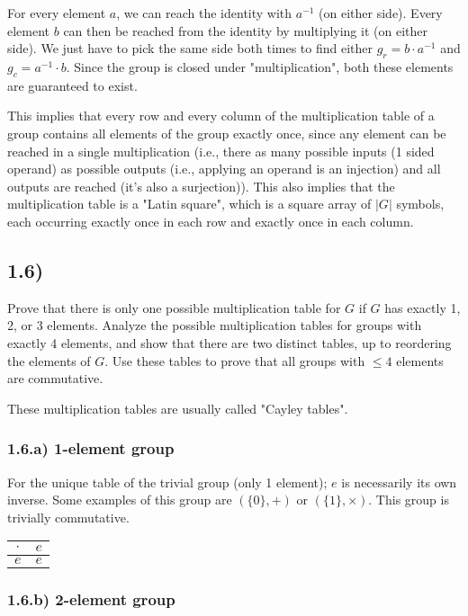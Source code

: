 For every element $a$, we can reach the identity with $a^{-1}$ (on either side). Every element $b$ can then be reached from the identity by multiplying it (on either side). We just have to pick the same side both times to find either $g_r = b \cdot a^{-1}$ and $g_c = a^{-1} \cdot b$. Since the group is closed under "multiplication", both these elements are guaranteed to exist.

This implies that every row and every column of the multiplication table of a group contains all elements of the group exactly once, since any element can be reached in a single multiplication (i.e., there as many possible inputs (1 sided operand) as possible outputs (i.e., applying an operand is an injection) and all outputs are reached (it's also a surjection)). This also implies that the multiplication table is a "Latin square", which is a square array of $|G|$ symbols, each occurring exactly once in each row and exactly once in each column. 



\subsection*{1.6)}

Prove that there is only one possible multiplication table for $G$ if $G$ has exactly 1, 2, or 3 elements. Analyze the possible multiplication tables for groups with exactly 4 elements, and show that there are two distinct tables, up to reordering the elements of $G$. Use these tables to prove that all groups with $\leq 4$ elements are commutative.

These multiplication tables are usually called "Cayley tables".


\subsubsection*{1.6.a) 1-element group}

For the unique table of the trivial group (only 1 element); $e$ is necessarily its own inverse. Some examples of this group are $(\{0\}, +)$ or $(\{1\}, \times)$. This group is trivially commutative.

\begin{tabular}{|c||c|}
\hline
$\cdot$ & $e$ \\
\hline \hline
$e    $ & $e$ \\
\hline
\end{tabular}


\subsubsection*{1.6.b) 2-element group}

